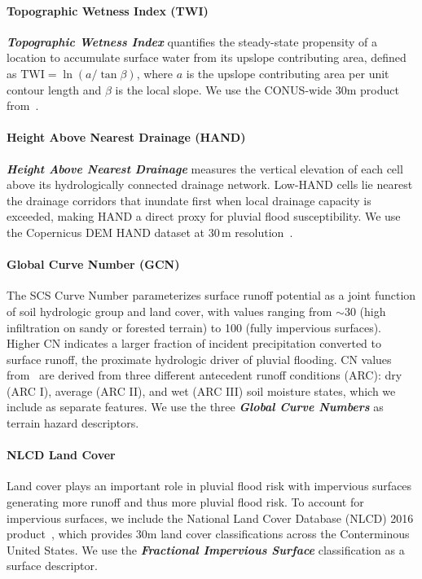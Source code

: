 \paragraph{Topographic Wetness Index (TWI)}
\textbf{\textit{Topographic Wetness Index}} quantifies the steady-state propensity of a location to accumulate surface water from its upslope contributing area, defined as $\mathrm{TWI} = \ln(a/\tan\beta)$, where $a$ is the upslope contributing area per unit contour length and $\beta$ is the local slope.
%
We use the CONUS-wide 30m product from~\cite{hoylman_30m_2021}.

\paragraph{Height Above Nearest Drainage (HAND)}
\textbf{\textit{Height Above Nearest Drainage}} measures the vertical elevation of each cell above its hydrologically connected drainage network.
%
Low-HAND cells lie nearest the drainage corridors that inundate first when local drainage capacity is exceeded, making HAND a direct proxy for pluvial flood susceptibility.
%
We use the Copernicus DEM HAND dataset at 30\,m resolution~\cite{aws_copernicus_dem}.

\paragraph{Global Curve Number (GCN)}
The SCS Curve Number parameterizes surface runoff potential as a joint function of soil hydrologic group and land cover, with values ranging from $\sim$30 (high infiltration on sandy or forested terrain) to 100 (fully impervious surfaces).
%
Higher CN indicates a larger fraction of incident precipitation converted to surface runoff, the proximate hydrologic driver of pluvial flooding.
%
CN values from~\cite{jaafar_gcn250_2019} are derived from three different antecedent runoff conditions (ARC): dry (ARC I), average (ARC II), and wet (ARC III) soil moisture states, which we include as separate features.
%
We use the three \textbf{\textit{Global Curve Numbers}} as terrain hazard descriptors.

\paragraph{NLCD Land Cover}
Land cover plays an important role in pluvial flood risk with impervious surfaces generating more runoff and thus more pluvial flood risk.
%
To account for impervious surfaces, we include the National Land Cover Database (NLCD) 2016 product~\cite{usgs_annual_nlcd_2024}, which provides 30m land cover classifications across the Conterminous United States.
%
We use the \textbf{\textit{Fractional Impervious Surface}} classification as a surface descriptor.

